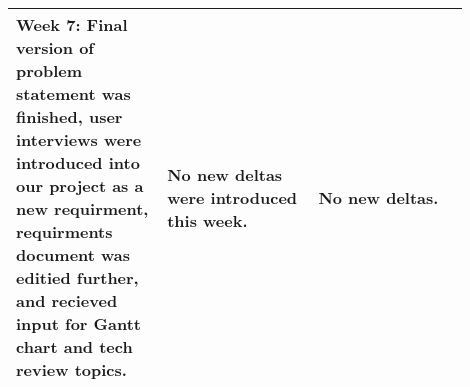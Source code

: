 \documentclass[10pt,journal,compsoc,draftclsnofoot]{IEEEtran}
\begin{document}
\begin{flushleft}
\begin{center}
\begin{table}[H]
\begin{tabular}{ | p{0.3\linewidth} | p{0.3\linewidth} | p{0.3\linewidth} | }
Week 7: Final version of problem statement was finished, user interviews were introduced into our project as a new requirment, requirments document was editied further, and recieved input for Gantt chart and tech review topics. &  
No new deltas were introduced this week. & 
No new deltas. \\ \hline


\end{tabular}
\newline
\label{table:retro}
\end{table}
\end{center}




\end{flushleft}
\end{document}

